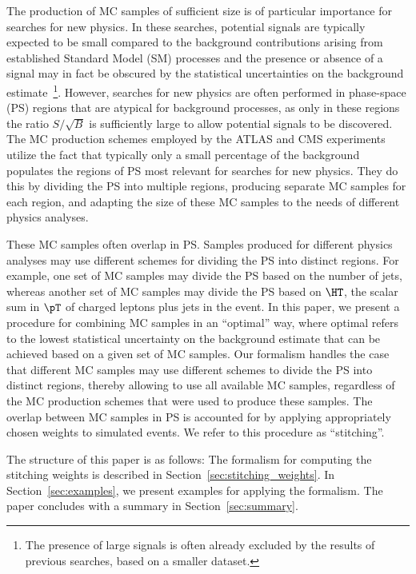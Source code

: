 The production of MC samples of sufficient size is of particular importance for searches for new physics.
In these searches, potential signals are typically expected to be small
compared to the background contributions arising from established Standard Model (SM) processes
and the presence or absence of a signal may in fact be obscured by the statistical uncertainties on the background estimate~\footnote{
The presence of large signals is often already excluded by the results of previous searches, based on a smaller dataset.}.
However, searches for new physics are often performed in phase-space (PS) regions that are atypical for background processes,
as only in these regions the ratio $S/\sqrt{B}$ is sufficiently large to allow potential signals to be discovered.
The MC production schemes employed by the ATLAS and CMS experiments utilize the fact 
that typically only a small percentage of the background populates the regions of PS most relevant for searches for new physics.
They do this by dividing the PS into multiple regions, producing separate MC samples for each region,
and adapting the size of these MC samples to the needs of different physics analyses.

These MC samples often overlap in PS.
Samples produced for different physics analyses may use different schemes for dividing the PS into distinct regions.
For example, one set of MC samples may divide the PS based on the number of jets, 
whereas another set of MC samples may divide the PS based on $\HT$, the scalar sum in $\pT$ of charged leptons plus jets in the event.
In this paper, we present a procedure for combining MC samples in an ``optimal'' way,
where optimal refers to the lowest statistical uncertainty on the background estimate that can be achieved based on a given set of MC samples.
Our formalism handles the case that different MC samples may use different schemes to divide the PS into distinct regions,
thereby allowing to use all available MC samples, regardless of the MC production schemes that were used to produce these samples.
The overlap between MC samples in PS is accounted for by applying appropriately chosen weights to simulated events.
We refer to this procedure as ``stitching''.

The structure of this paper is as follows:
The formalism for computing the stitching weights is described in Section~\ref{sec:stitching_weights}.
In Section~\ref{sec:examples}, we present examples for applying the formalism.
The paper concludes with a summary in Section~\ref{sec:summary}.
